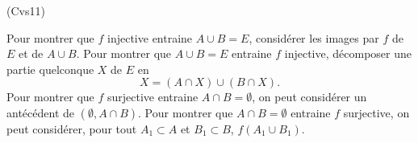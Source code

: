 \begin{tiny}(Cvs11)\end{tiny}
Pour montrer que $f$ injective entraine $A \cup B = E$, considérer les images par $f$ de $E$ et de $A \cup B$.\newline
Pour montrer que $A \cup B = E$ entraine $f$ injective, décomposer une partie quelconque $X$ de $E$ en
\[
 X = (A \cap X) \cup (B \cap X).
\]
Pour montrer que $f$ surjective entraine $A \cap B = \emptyset$, on peut considérer un antécédent de $(\emptyset, A\cap B)$.\newline
Pour montrer que $A \cap B = \emptyset$ entraine $f$ surjective, on peut considérer, pour tout $A_1 \subset A$ et $B_1 \subset B$, $f(A_1 \cup B_1)$.